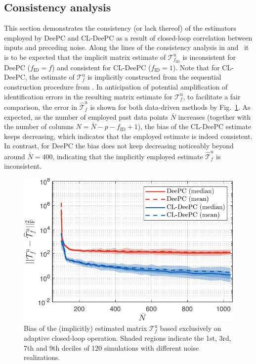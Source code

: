 \subsection{Consistency analysis}
\noindent This section demonstrates the consistency (or lack thereof) of the estimators employed by \ac{DeePC} and \ac{CL-DeePC} as a result of closed-loop correlation between inputs and preceding noise. Along the lines of the consistency analysis in  and~\cite{Dinkla2023} it is to be expected that the implicit matrix estimate of $\mathcal{T}_{f_\mathrm{ID}}^\mathrm{u}$ is inconsistent for \ac{DeePC} ($f_\mathrm{ID}=f$) and consistent for \ac{CL-DeePC} ($f_\mathrm{ID}=1$). Note that for \ac{CL-DeePC}, the estimate of $\mathcal{T}_f^\mathrm{u}$ is implicitly constructed from the sequential construction procedure from . In anticipation of potential amplification of identification errors in the resulting matrix estimate for $\mathcal{T}_f^\mathrm{u}$, to facilitate a fair comparison, the error in $\widehat{\mathcal{T}}_f^\mathrm{u}$ is shown for both data-driven methods by Fig.~\ref{fig:Tuf_consistency}. As expected, as the number of employed past data points $\bar{N}$ increases (together with the number of columns $N=\bar{N}-p-f_\mathrm{ID}+1$), the bias of the \ac{CL-DeePC} estimate keeps decreasing, which indicates that the employed estimate is indeed consistent. In contrast, for \ac{DeePC} the bias does not keep decreasing noticeably beyond around $\bar{N}=400$, indicating that the implicitly employed estimate $\widehat{\mathcal{T}}_f^\mathrm{u}$ is inconsistent.
\begin{figure}[b!]
\begin{center}
\includegraphics[width=\columnwidth]{results/figures/Consistency_Nbar_99-1039-50_p_20_f_20_Re_1_Ru_1_Rdu_0_Q_100_R_0_dR_10.pdf}    %
\caption{Bias of the (implicitly) estimated matrix $\mathcal{T}_f^\mathrm{u}$ based exclusively on adaptive closed-loop operation. Shaded regions indicate the 1st, 3rd, 7th and 9th deciles of 120 simulations with different noise realizations.}%
\label{fig:Tuf_consistency}                                 %
\end{center}                                 %
\end{figure}
